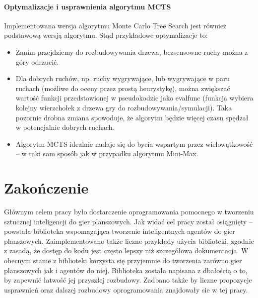 \documentclass[polish,shortabstract,inz]{iithesis}
\begin{document}
\subsubsection{Optymalizacje i usprawnienia algorytmu MCTS}
Implementowana wersja algorytmu Monte Carlo Tree Search jest również podstawową wersją algorytmu.
Stąd przykładowe optymalizacje to:

\begin{itemize}
  \item Zanim przejdziemy do rozbudowywania drzewa, bezsensowne ruchy można z góry odrzucić.
  \item Dla dobrych ruchów, np. ruchy wygrywające, lub wygrywające w paru ruchach (możliwe do oceny przez prostą heurystykę), można zwiększać wartość funkcji przedstawionej w pseudokodzie jako eval\textunderscore func (funkcja wybiera kolejny wierzchołek z drzewa gry do rozbudowywania/symulacji). Taka pozornie drobna zmiana spowoduje, że algorytm będzie więcej czasu spędzał w potencjalnie dobrych ruchach.
  \item Algorytm MCTS idealnie nadaje się do bycia wspartym przez wielowątkowość -- w taki sam sposób jak w przypadku algorytmu Mini-Max.
\end{itemize}

\chapter{Zakończenie}
Głównym celem pracy było dostarczenie oprogramowania pomocnego w tworzeniu sztucznej inteligencji do gier planszowych.
Jak widać cel pracy został osiągnięty -- powstała biblioteka wspomagająca tworzenie inteligentnych agentów do gier planszowych.
Zaimplementowano także liczne przykłady użycia biblioteki, zgodnie z zasadą, że dostęp do kodu jest często lepszy niż szczegółowa dokumentacja.
W obecnym stanie z biblioteki korzysta się przyjemnie do tworzenia zarówno gier planszowych jak i agentów do niej.
Biblioteka została napisana z dbałością o to, by zapewnić łatwość jej przyszłej rozbudowy.
Zadbano także by liczne propozycje usprawnień oraz dalszej rozbudowy oprogramowania znajdowały sie w tej pracy.


\end{document}
